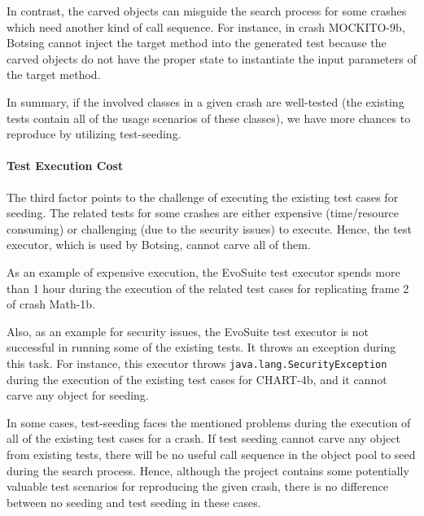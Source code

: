 In contrast, the carved objects can misguide the search process for some crashes which need another kind of call sequence.  For instance, in crash MOCKITO-9b, Botsing cannot inject the target method into the generated test because the carved objects do not have the proper state to instantiate the input parameters of the target method.

In summary, if the involved classes in a given crash are well-tested (the existing tests contain all of the usage scenarios of these classes), we have more chances to reproduce by utilizing test-seeding.


\paragraph{Test Execution Cost} The third factor points to the challenge of executing the existing test cases for seeding. The related tests for some crashes are either expensive (time/resource consuming) or challenging (due to the security issues) to execute. Hence, the \evosuite test executor, which is used by Botsing, cannot carve all of them. 

As an example of expensive execution, the EvoSuite test executor spends more than 1 hour during the execution of the related test cases for replicating frame 2 of crash Math-1b.

Also, as an example for security issues, the EvoSuite test executor is not successful in running some of the existing tests. It throws an exception during this task. For instance, this executor throws \texttt{java.lang.SecurityException} during the execution of the existing test cases for CHART-4b, and it cannot carve any object for seeding.

In some cases, test-seeding faces the mentioned problems during the execution of all of the existing test cases for a crash. If test seeding cannot carve any object from existing tests, there will be no useful call sequence in the object pool to seed during the search process. Hence, although the project contains some potentially valuable test scenarios for reproducing the given crash, there is no difference between no seeding and test seeding in these cases.



